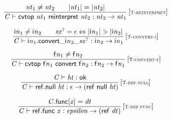 \vspace{1ex}

$$
\begin{array}{@{}c@{}}\displaystyle
\frac{
{\mathit{nt}}_{{1}} \neq {\mathit{nt}}_{{2}}
 \qquad
{|{\mathit{nt}}_{{1}}|} = {|{\mathit{nt}}_{{2}}|}
}{
{\mathit{C}} \vdash \mathsf{cvtop}~{\mathit{nt}}_{{1}}~\mathsf{reinterpret}~{\mathit{nt}}_{{2}} : {\mathit{nt}}_{{2}} \rightarrow {\mathit{nt}}_{{1}}
} \, {[\textsc{\scriptsize T{-}reinterpret}]}
\qquad
\end{array}
$$

$$
\begin{array}{@{}c@{}}\displaystyle
\frac{
{{\mathsf{i}}{{\mathit{n}}}}_{{1}} \neq {{\mathsf{i}}{{\mathit{n}}}}_{{2}}
 \qquad
{{\mathit{sx}}^?} = \epsilon \Leftrightarrow {|{{\mathsf{i}}{{\mathit{n}}}}_{{1}}|} > {|{{\mathsf{i}}{{\mathit{n}}}}_{{2}}|}
}{
{\mathit{C}} \vdash {{\mathsf{i}}{{\mathit{n}}}}_{{1}} . {{{{\mathsf{convert}}{\mathsf{\_}}}{{{\mathsf{i}}{{\mathit{n}}}}_{{2}}}}{\mathsf{\_}}}{{{\mathit{sx}}^?}} : {{\mathsf{i}}{{\mathit{n}}}}_{{2}} \rightarrow {{\mathsf{i}}{{\mathit{n}}}}_{{1}}
} \, {[\textsc{\scriptsize T{-}convert{-}i}]}
\qquad
\end{array}
$$

$$
\begin{array}{@{}c@{}}\displaystyle
\frac{
{{\mathsf{f}}{{\mathit{n}}}}_{{1}} \neq {{\mathsf{f}}{{\mathit{n}}}}_{{2}}
}{
{\mathit{C}} \vdash \mathsf{cvtop}~{{\mathsf{f}}{{\mathit{n}}}}_{{1}}~\mathsf{convert}~{{\mathsf{f}}{{\mathit{n}}}}_{{2}} : {{\mathsf{f}}{{\mathit{n}}}}_{{2}} \rightarrow {{\mathsf{f}}{{\mathit{n}}}}_{{1}}
} \, {[\textsc{\scriptsize T{-}convert{-}f}]}
\qquad
\end{array}
$$

\vspace{1ex}

$$
\begin{array}{@{}c@{}}\displaystyle
\frac{
{\mathit{C}} \vdash {\mathit{ht}} : \mathsf{ok}
}{
{\mathit{C}} \vdash \mathsf{ref.null}~{\mathit{ht}} : \epsilon \rightarrow (\mathsf{ref}~\mathsf{null}~{\mathit{ht}})
} \, {[\textsc{\scriptsize T{-}ref.null}]}
\qquad
\end{array}
$$

$$
\begin{array}{@{}c@{}}\displaystyle
\frac{
{\mathit{C}}.\mathsf{func}{}[{\mathit{x}}] = {\mathit{dt}}
}{
{\mathit{C}} \vdash \mathsf{ref.func}~{\mathit{x}} : {\mathit{epsilon}} \rightarrow (\mathsf{ref}~{\mathit{dt}})
} \, {[\textsc{\scriptsize T{-}ref.func}]}
\qquad
\end{array}
$$

